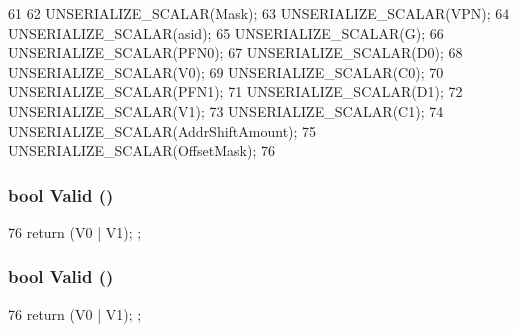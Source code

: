 \begin{DoxyCode}
61 {
62     UNSERIALIZE_SCALAR(Mask);
63     UNSERIALIZE_SCALAR(VPN);
64     UNSERIALIZE_SCALAR(asid);
65     UNSERIALIZE_SCALAR(G);
66     UNSERIALIZE_SCALAR(PFN0);
67     UNSERIALIZE_SCALAR(D0);
68     UNSERIALIZE_SCALAR(V0);
69     UNSERIALIZE_SCALAR(C0);
70     UNSERIALIZE_SCALAR(PFN1);
71     UNSERIALIZE_SCALAR(D1);
72     UNSERIALIZE_SCALAR(V1);
73     UNSERIALIZE_SCALAR(C1);
74     UNSERIALIZE_SCALAR(AddrShiftAmount);
75     UNSERIALIZE_SCALAR(OffsetMask);
76 }
\end{DoxyCode}
\hypertarget{structMipsISA_1_1PTE_a62f0e274c1fe43a9411e2c6d3d144913}{
\subsubsection[{Valid}]{\setlength{\rightskip}{0pt plus 5cm}bool Valid ()}}
\label{structMipsISA_1_1PTE_a62f0e274c1fe43a9411e2c6d3d144913}



\begin{DoxyCode}
76 { return (V0 | V1); };
\end{DoxyCode}
\hypertarget{structMipsISA_1_1PTE_a62f0e274c1fe43a9411e2c6d3d144913}{
\subsubsection[{Valid}]{\setlength{\rightskip}{0pt plus 5cm}bool Valid ()}}
\label{structMipsISA_1_1PTE_a62f0e274c1fe43a9411e2c6d3d144913}



\begin{DoxyCode}
76 { return (V0 | V1); };
\end{DoxyCode}


